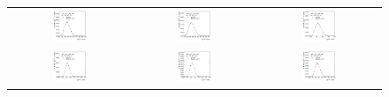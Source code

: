 \begin{figure}[ht]
\begin{tabular}{ccc}
    \includegraphics[width=0.3\textwidth]{figures/ResFit_Spring10QCDFlat_Gauss_Eta0_Spectrum_PtBin4} &
    \includegraphics[width=0.3\textwidth]{figures/ResFit_Spring10QCDFlat_Gauss_Eta0_Spectrum_PtBin5} &
    \includegraphics[width=0.3\textwidth]{figures/ResFit_Spring10QCDFlat_Gauss_Eta0_Spectrum_PtBin6} \\

    \includegraphics[width=0.3\textwidth]{figures/ResFit_Spring10QCDFlat_Gauss_Eta0_Spectrum_PtBin7} &
    \includegraphics[width=0.3\textwidth]{figures/ResFit_Spring10QCDFlat_Gauss_Eta0_Spectrum_PtBin8} &
    \includegraphics[width=0.3\textwidth]{figures/ResFit_Spring10QCDFlat_Gauss_Eta0_Spectrum_PtBin9} \\


\end{tabular}
\end{figure}

